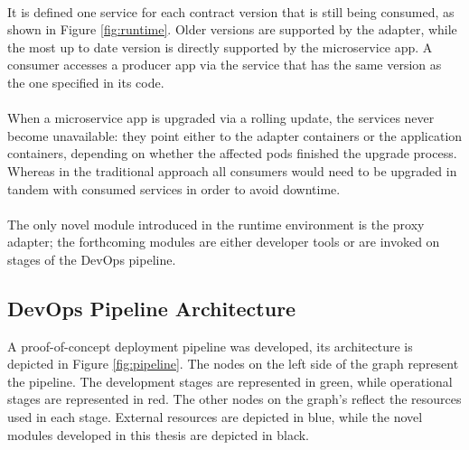 \paragraph{}

It is defined one service for each contract version that is still being consumed, as shown in Figure \ref{fig:runtime}.
Older versions are supported by the adapter, while the most up to date version is directly supported by the microservice app.
A consumer accesses a producer app via the service that has the same version as the one specified in its code.

\paragraph{}

When a microservice app is upgraded via a rolling update,
the services never become unavailable:
they point either to the adapter containers or the application containers, depending on whether the affected pods finished the upgrade process.
Whereas in the traditional approach all consumers would need to be upgraded in tandem with consumed services in order to avoid downtime.

\paragraph{}

The only novel module introduced in the runtime environment is the proxy adapter;
the forthcoming modules are either developer tools or are invoked on stages of the DevOps pipeline.

\subsection{DevOps Pipeline Architecture} %
\label{sec:devops_pipeline_architecture}

A proof-of-concept deployment pipeline was developed, its architecture is depicted in Figure \ref{fig:pipeline}.
The nodes on the left side of the graph represent the pipeline.
The development stages are represented in green, while operational stages are represented in red.
The other nodes on the graph's reflect the resources used in each stage.
External resources are depicted in blue, while the novel modules developed in this thesis are depicted in black.

\paragraph{}

